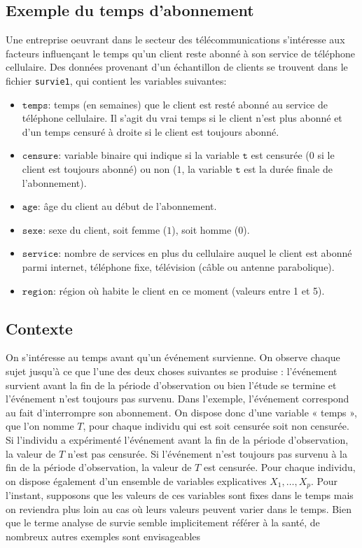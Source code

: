 \documentclass[
  11pt,
  letterpaper,
]{scrbook}
\providecommand{\tightlist}{%
  \setlength{\itemsep}{0pt}\setlength{\parskip}{0pt}}\usepackage{longtable,booktabs,array}
\theoremstyle{definition}
\theoremstyle{remark}
\begin{document}
\hypertarget{exemple-du-temps-dabonnement}{%
\subsection{Exemple du temps
d'abonnement}\label{exemple-du-temps-dabonnement}}

Une entreprise oeuvrant dans le secteur des télécommunications
s'intéresse aux facteurs influençant le temps qu'un client reste abonné
à son service de téléphone cellulaire. Des données provenant d'un
échantillon de clients se trouvent dans le fichier \texttt{survie1}, qui
contient les variables suivantes:

\begin{itemize}
\tightlist
\item
  \(\texttt{temps}\): temps (en semaines) que le client est resté abonné
  au service de téléphone cellulaire. Il s'agit du vrai temps si le
  client n'est plus abonné et d'un temps censuré à droite si le client
  est toujours abonné.
\item
  \(\texttt{censure}\): variable binaire qui indique si la variable
  \(\texttt{t}\) est censurée (\(0\) si le client est toujours abonné)
  ou non (\(1\), la variable \(\texttt{t}\) est la durée finale de
  l'abonnement).
\item
  \(\texttt{age}\): âge du client au début de l'abonnement.
\item
  \(\texttt{sexe}\): sexe du client, soit femme (\(1\)), soit homme
  (\(0\)).
\item
  \(\texttt{service}\): nombre de services en plus du cellulaire auquel
  le client est abonné parmi internet, téléphone fixe, télévision (câble
  ou antenne parabolique).
\item
  \(\texttt{region}\): région où habite le client en ce moment (valeurs
  entre 1 et 5).
\end{itemize}

\hypertarget{contexte}{%
\subsection{Contexte}\label{contexte}}

On s'intéresse au temps avant qu'un événement survienne. On observe
chaque sujet jusqu'à ce que l'une des deux choses suivantes se produise
: l'événement survient avant la fin de la période d'observation ou bien
l'étude se termine et l'événement n'est toujours pas survenu. Dans
l'exemple, l'événement correspond au fait d'interrompre son abonnement.
On dispose donc d'une variable « temps », que l'on nomme \(T\), pour
chaque individu qui est soit censurée soit non censurée. Si l'individu a
expérimenté l'événement avant la fin de la période d'observation, la
valeur de \(T\) n'est pas censurée. Si l'événement n'est toujours pas
survenu à la fin de la période d'observation, la valeur de \(T\) est
censurée. Pour chaque individu, on dispose également d'un ensemble de
variables explicatives \(X_1, \ldots, X_p\). Pour l'instant, supposons
que les valeurs de ces variables sont fixes dans le temps mais on
reviendra plus loin au cas où leurs valeurs peuvent varier dans le
temps. Bien que le terme analyse de survie semble implicitement référer
à la santé, de nombreux autres exemples sont envisageables
\end{document}
